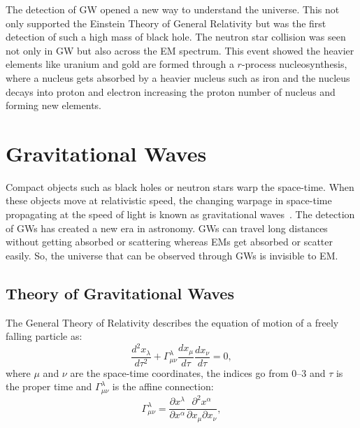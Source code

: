 \documentclass{ttuthes2007}
\begin{document}
The detection of \ac{GW} opened a new way to understand the universe. This not
only supported the Einstein Theory of General Relativity but was the first
detection of such a high mass of black hole. The neutron star collision was seen not only in \ac{GW} but also
across the \ac{EM} spectrum. This event showed the heavier elements like uranium and
gold are formed through a $r$-process nucleosynthesis, where a nucleus gets absorbed
by a heavier nucleus such as iron and the nucleus decays into proton and
electron increasing the proton number of nucleus and forming new elements. 



\chapter{Gravitational Waves}
Compact objects such as black holes or neutron stars warp the space-time. When these objects
move at relativistic speed, the changing warpage in space-time propagating at
the
speed of light is known as gravitational waves~\cite{thorne1995gravitational}. The
detection of \acp{GW} has created a new era in astronomy.
\acp{GW} can travel long distances without getting absorbed or scattering whereas
\acp{EM} get absorbed or scatter easily. So, the universe that can be observed
through \acp{GW} is invisible to \ac{EM}. 

\section{Theory of Gravitational Waves}
The General Theory of Relativity describes the equation of motion of a freely
falling particle as:
\begin{equation}
\frac{d^2x_\lambda}{d\tau^2}+\Gamma^\lambda_{\mu\nu}\frac{dx_\mu}{d\tau}\frac{dx_\nu}{d\tau}=0,
\end{equation}
where $\mu$ and $\nu$ are the space-time coordinates, the indices go from 0--3
and
$\tau$ is the proper time and  $\Gamma^\lambda_{\mu\nu}$ is the affine connection:
\begin{equation}
\Gamma^\lambda_{\mu\nu} =\frac{\partial x^\lambda}{\partial
x^\alpha}\frac{\partial^2x^\alpha}{\partial x_\mu \partial x_\nu},
\end{equation}
\end{document}
